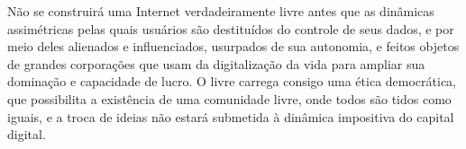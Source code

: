 Não se construirá uma Internet verdadeiramente livre antes que as dinâmicas assimétricas pelas quais usuários são destituídos do controle de seus dados, e por meio deles alienados e influenciados, usurpados de sua autonomia, e feitos objetos de grandes corporações que usam da digitalização da vida para ampliar sua dominação e capacidade de lucro.
O \swr{} livre carrega consigo uma ética democrática, que possibilita a existência de uma comunidade livre, onde todos são tidos como iguais, e a troca de ideias não estará submetida à dinâmica impositiva do capital digital.

